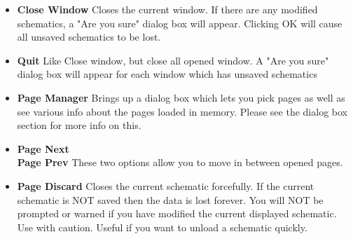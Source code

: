 \documentclass{article}
\begin{document}
\begin{itemize}
\item {\bf Close Window} Closes the current window.  If there are any
  modified schematics, a "Are you sure" dialog box will appear.
  Clicking OK will cause all unsaved schematics to be lost.
  
\item {\bf Quit} Like Close window, but close all opened window.  A
  "Are you sure" dialog box will appear for each window which has
  unsaved schematics
  
\item {\bf Page Manager} Brings up a dialog box which lets you pick
  pages as well as see various info about the pages loaded in memory.
  Please see the dialog box section for more info on this.
  

\item {\bf Page Next}\\
  {\bf Page Prev} These two options allow you to move in between
  opened pages.
  
\item {\bf Page Discard} Closes the current schematic forcefully.  If
  the current schematic is NOT saved then the data is lost forever.
  You will NOT be prompted or warned if you have modified the current
  displayed schematic.  Use with caution.  Useful if you want to
  unload a schematic quickly.

\end{itemize}
\end{document}
